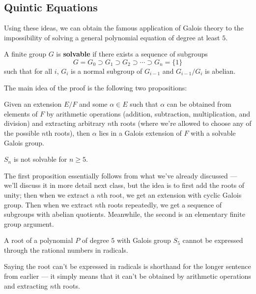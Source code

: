 \subsection{Quintic Equations}

Using these ideas, we can obtain the famous application of Galois theory to the impossibility of solving a general polynomial equation of degree at least $5$. 

\begin{definition}
    A finite group $G$ is \textbf{solvable} if there exists a sequence of subgroups \[G = G_0 \supset G_1 \supset G_2 \supset \cdots \supset G_n = \{1\}\] such that for all $i$, $G_i$ is a normal subgroup of $G_{i - 1}$ and $G_{i - 1}/G_i$ is abelian. 
\end{definition}

The main idea of the proof is the following two propositions: 

\begin{proposition}
    Given an extension $E/F$ and some $\alpha \in E$ such that $\alpha$ can be obtained from elements of $F$ by arithmetic operations (addition, subtraction, multiplication, and division) and extracting arbitrary $n$th roots (where we're allowed to choose any of the possible $n$th roots), then $\alpha$ lies in a Galois extension of $F$ with a solvable Galois group. 
\end{proposition}

\begin{proposition}
    $S_n$ is not solvable for $n \geq 5$. 
\end{proposition}

The first proposition essentially follows from what we've already discussed --- we'll discuss it in more detail next class, but the idea is to first add the roots of unity; then when we extract a $n$th root, we get an extension with cyclic Galois group. Then when we extract $n$th roots repeatedly, we get a sequence of subgroups with abelian quotients. Meanwhile, the second is an elementary finite group argument. 

\begin{corollary}
    A root of a polynomial $P$ of degree $5$ with Galois group $S_5$ cannot be expressed through the rational numbers in radicals. 
\end{corollary}

Saying the root can't be expressed in radicals is shorthand for the longer sentence from earlier --- it simply means that it can't be obtained by arithmetic operations and extracting $n$th roots. 

